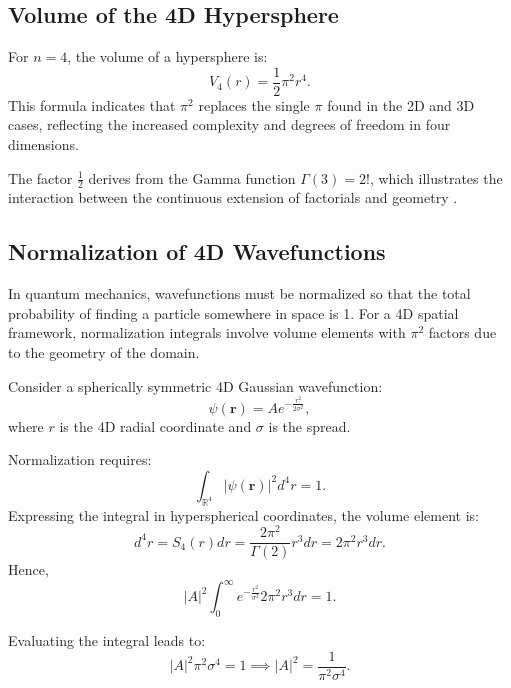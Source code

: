 \documentclass[12pt,a4paper]{article}
\begin{document}
\subsection{Volume of the 4D Hypersphere}

For \(n=4\), the volume of a hypersphere is:
\begin{equation}
V_4(r) = \frac{1}{2} \pi^2 r^4.
\end{equation}
This formula indicates that \(\pi^{2}\) replaces the single \(\pi\) found in the 2D and 3D cases, reflecting the increased complexity and degrees of freedom in four dimensions.

The factor \(\frac{1}{2}\) derives from the Gamma function \(\Gamma(3) = 2!\), which illustrates the interaction between the continuous extension of factorials and geometry \cite{gamma-function-geometry}.

\subsection{Normalization of 4D Wavefunctions}

In quantum mechanics, wavefunctions must be normalized so that the total probability of finding a particle somewhere in space is 1. For a 4D spatial framework, normalization integrals involve volume elements with \(\pi^{2}\) factors due to the geometry of the domain.

Consider a spherically symmetric 4D Gaussian wavefunction:
\begin{equation}
\psi(\mathbf{r}) = A e^{-\frac{r^2}{2\sigma^2}},
\end{equation}
where \(r\) is the 4D radial coordinate and \(\sigma\) is the spread.

Normalization requires:
\begin{equation}
\int_{\mathbb{R}^4} |\psi(\mathbf{r})|^2 d^4r = 1.
\end{equation}
Expressing the integral in hyperspherical coordinates, the volume element is:
\begin{equation}
d^4r = S_4(r) dr = \frac{2\pi^{2}}{\Gamma(2)} r^{3} dr = 2 \pi^{2} r^{3} dr.
\end{equation}
Hence,
\begin{equation}
|A|^{2} \int_{0}^{\infty} e^{-\frac{r^{2}}{\sigma^{2}}} 2 \pi^{2} r^{3} dr = 1.
\end{equation}

Evaluating the integral leads to:
\begin{equation}
|A|^{2} \pi^{2} \sigma^{4} = 1 \implies |A|^{2} = \frac{1}{\pi^{2} \sigma^{4}}.
\end{equation}
\end{document}
